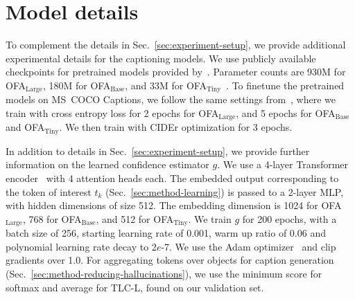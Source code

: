 \documentclass[10pt,twocolumn,letterpaper]{article}
\newcommand{\secref}[1]{Sec.\xspace~\ref{#1}}
\newcommand{\minisection}[1]{\noindent{\textbf{#1.}}}
\newcommand{\ApproachName}{TLC\xspace}
\newcommand{\OFALarge}{OFA$_{\text{Large}}$\xspace}
\newcommand{\OFABase}{OFA$_{\text{Base}}$\xspace}
\newcommand{\OFATiny}{OFA$_{\text{Tiny}}$\xspace}
\begin{document}
\section{Model details}
\label{sec:supp-model}

\minisection{Captioning} To complement the details in \secref{sec:experiment-setup}, we provide additional experimental details for the captioning models. We use publicly available checkpoints for pretrained models provided by~\cite{ofa}. Parameter counts are 930M for \OFALarge, 180M for \OFABase, and 33M for \OFATiny~\cite{ofa}. To finetune the pretrained models on MS~COCO Captions, we follow the same settings from~\cite{ofa}, where we train with cross entropy loss for 2 epochs for \OFALarge, and 5 epochs for \OFABase and \OFATiny. We then train with CIDEr optimization for 3 epochs.

\minisection{\ApproachName-L} In addition to details in \secref{sec:experiment-setup}, we provide further information on the learned confidence estimator $g$. We use a 4-layer Transformer encoder~\cite{vaswani2017attention} with 4 attention heads each. The embedded output corresponding to the token of interest $t_k$ (\secref{sec:method-learning}) is passed to a 2-layer MLP, with hidden dimensions of size 512. The embedding dimension is 1024 for \OFALarge, 768 for \OFABase, and 512 for \OFATiny.  We train $g$ for 200 epochs, with a batch size of 256, starting learning rate of 0.001, warm up ratio of 0.06 and polynomial learning rate decay to 2$e$-7. We use the Adam optimizer~\cite{kingma2014adam} and clip gradients over 1.0. For aggregating tokens over objects for caption generation (\secref{sec:method-reducing-hallucinations}), we use the minimum score for softmax and average for \ApproachName-L, found on our validation set.
\end{document}
